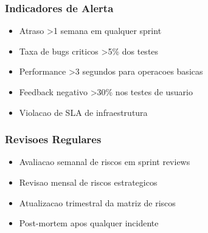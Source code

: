 \subsubsection{Indicadores de Alerta}
\begin{itemize}
    \item Atraso >1 semana em qualquer sprint
    \item Taxa de bugs criticos >5\% dos testes
    \item Performance >3 segundos para operacoes basicas
    \item Feedback negativo >30\% nos testes de usuario
    \item Violacao de SLA de infraestrutura
\end{itemize}

\subsubsection{Revisoes Regulares}
\begin{itemize}
    \item Avaliacao semanal de riscos em sprint reviews
    \item Revisao mensal de riscos estrategicos
    \item Atualizacao trimestral da matriz de riscos
    \item Post-mortem apos qualquer incidente
\end{itemize}
